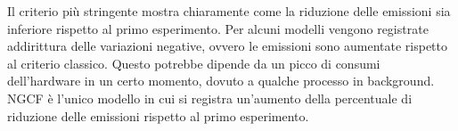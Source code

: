 \begin{table}[H]
    \centering
    \caption{Confronto delle emissioni}
\end{table}

\noindent Il criterio più stringente mostra chiaramente come la riduzione delle emissioni sia inferiore rispetto al primo esperimento.
Per alcuni modelli vengono registrate addirittura delle variazioni negative, ovvero le emissioni sono aumentate rispetto al criterio classico. Questo potrebbe dipende da un picco di consumi dell'hardware in un certo momento, dovuto a qualche processo in background.
NGCF è l'unico modello in cui si registra un'aumento della percentuale di riduzione delle emissioni rispetto al primo esperimento.


